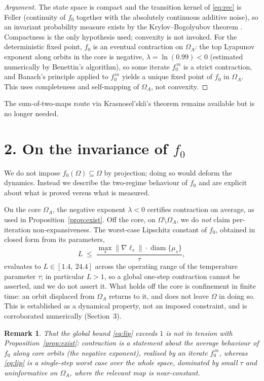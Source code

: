 \documentclass[11pt]{article}
\newtheorem{remark}{Remark}
\newcommand{\Om}{\Omega}
\begin{document}
\begin{proof}[Argument]
The state space is compact and the transition kernel of \eqref{eq:rec} is Feller
(continuity of $f_0$ together with the absolutely continuous additive noise), so
an invariant probability measure exists by the Krylov--Bogolyubov theorem
\cite{krylov}. Compactness is the only hypothesis used; convexity is not invoked.
For the deterministic fixed point, $f_0$ is an eventual contraction on $\Om_A$:
the top Lyapunov exponent along orbits in the core is negative,
$\lambda = \ln(0.99) < 0$ (estimated numerically by Benettin's algorithm), so
some iterate $f_0^{\,m}$ is a strict contraction, and Banach's principle applied
to $f_0^{\,m}$ yields a unique fixed point of $f_0$ in $\Om_A$. This uses
completeness and self-mapping of $\Om_A$, not convexity.
\end{proof}

The sum-of-two-maps route via Krasnosel'ski\u{\i}'s theorem \cite{kras} remains
available but is no longer needed.

\section*{2. On the invariance of $f_0$}

We do not impose $f_0(\Om) \subseteq \Om$ by projection; doing so would deform the
dynamics. Instead we describe the two-regime behaviour of $f_0$ and are explicit
about what is proved versus what is measured.

On the core $\Om_A$, the negative exponent $\lambda < 0$ certifies contraction on
average, as used in Proposition~\ref{prop:exist}. Off the core, on
$\Om \setminus \Om_A$, we do \emph{not} claim per-iteration non-expansiveness. The
worst-case Lipschitz constant of $f_0$, obtained in closed form from its
parameters,
\begin{equation}
  L \;\le\; \frac{\max_s \lVert \nabla \ell_s\rVert \cdot
  \operatorname{diam}\{\mu_s\}}{\tau},
  \label{eq:lip}
\end{equation}
evaluates to $L \in [1.4,\ 24.4]$ across the operating range of the temperature
parameter $\tau$; in particular $L > 1$, so a global one-step contraction cannot
be asserted, and we do not assert it. What holds off the core is confinement in
finite time: an orbit displaced from $\Om_A$ returns to it, and does not leave
$\Om$ in doing so. This is established as a dynamical property, not an imposed
constraint, and is corroborated numerically (Section~3).

\begin{remark}
That the global bound \eqref{eq:lip} exceeds $1$ is not in tension with
Proposition~\ref{prop:exist}: contraction is a statement about the average
behaviour of $f_0$ along core orbits (the negative exponent), realised by an
iterate $f_0^{\,m}$, whereas \eqref{eq:lip} is a single-step worst case over the
whole space, dominated by small $\tau$ and uninformative on $\Om_A$, where the
relevant map is near-constant.
\end{remark}
\end{document}
